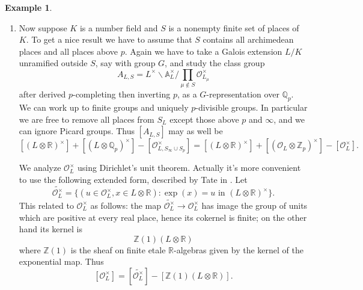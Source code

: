 \documentclass[12pt]{article}
\theoremstyle{definition}
\newtheorem{example}[theorem]{Example}
\newcommand{\on}{\operatorname}
\newcommand{\mc}{\mathcal}
\newcommand{\mbb}{\mathbb}
\begin{document}
\begin{example}
\begin{enumerate}
Geometrically, of course, these are just the usual Euler characteristics of $S^2$ and $\mbb{R}\mbb{P}^2$, and this archimedean version of Tate's Euler characteristic formula follows from the fact that these spaces admit, say, triangulations (which gives a good explanation for why the Euler characteristic of a local system only depends on the dimension).

Uniformly, we can say that if $K$ is an archimedean local field, then the Euler characteristic of $X_K$ is $[K:\mbb{R}]$ (exactly the opposite sign from the case of finite extensions of $\mbb{Q}_p$!).
\item Now suppose $K$ is a number field and $S$ is a nonempty finite set of places of $K$.  To get a nice result we have to assume that $S$ contains all archimedean places and all places above $p$.  Again we have to take a Galois extension $L/K$ unramified outside $S$, say with group $G$, and study the class group
$$A_{L,S} = L^\times\backslash \mathbb{A}_L^\times/\prod_{\mu\not\in S}\mathcal{O}_{L_\mu}^\times$$
after derived $p$-completing then inverting $p$, as a $G$-representation over $\mbb{Q}_p$. We can work up to finite groups and uniquely $p$-divisible groups.  In particular we are free to remove all places from $S_L$ except those above $p$ and $\infty$, and we can ignore Picard groups.  Thus $[A_{L,S}]$ may as well be
$$[(L\otimes\mbb{R})^\times] + [(L\otimes\mbb{Q}_p)^\times] - [\mc{O}_{L,S_\infty\cup S_p}^\times] = [(L\otimes\mbb{R})^\times] + [(\mc{O}_L\otimes\mbb{Z}_p)^\times] - [\mc{O}_L^\times].$$

We analyze $\mathcal{O}_L^\times$ using Dirichlet's unit theorem.  Actually it's more convenient to use the following extended form, described by Tate in \cite{TateStark}.  Let
$$\widetilde{\mathcal{O}_L^\times} = \{(u\in\mc{O}_L^\times,x\in L\otimes\mbb{R}): \on{exp}(x) = u\text{ in } (L\otimes\mbb{R})^\times\}.$$
This related to $\mc{O}_L^\times$ as follows: the map $\widetilde{\mathcal{O}_L^\times}\to\mathcal{O}_L^\times$ has image the group of units which are positive at every real place, hence its cokernel is finite; on the other hand its kernel is
$$\mbb{Z}(1)(L\otimes\mbb{R})$$
where $\mbb{Z}(1)$ is the sheaf on finite etale $\mbb{R}$-algebras given by the kernel of the exponential map.  Thus
$$[\mc{O}_L^\times] = [\widetilde{\mc{O}_L^\times}] - [\mbb{Z}(1)(L\otimes\mbb{R})].$$


\end{enumerate}
\end{example}
\end{document}

